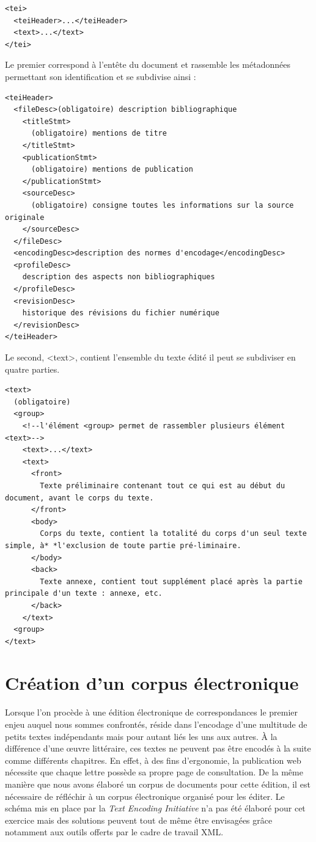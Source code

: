 \documentclass[12pt,a4paper]{book} %
\begin{document}
\begin{lstlisting}
<tei>
  <teiHeader>...</teiHeader>
  <text>...</text>
</tei>
\end{lstlisting}
\bigskip

Le premier correspond à l'entête du document et rassemble les métadonnées permettant son identification et se subdivise ainsi : 
\bigskip

\begin{lstlisting}
<teiHeader>
  <fileDesc>(obligatoire) description bibliographique
    <titleStmt>
      (obligatoire) mentions de titre
    </titleStmt>
    <publicationStmt>
      (obligatoire) mentions de publication
    </publicationStmt>
    <sourceDesc>
      (obligatoire) consigne toutes les informations sur la source originale 
    </sourceDesc>  
  </fileDesc>
  <encodingDesc>description des normes d'encodage</encodingDesc>
  <profileDesc>
    description des aspects non bibliographiques
  </profileDesc>
  <revisionDesc>
    historique des révisions du fichier numérique
  </revisionDesc>
</teiHeader>
\end{lstlisting}
\bigskip

Le second, <text>, contient l'ensemble du texte édité il peut se subdiviser en quatre parties.
\bigskip

\begin{lstlisting}
<text>
  (obligatoire)
  <group>
    <!--l'élément <group> permet de rassembler plusieurs élément <text>-->
    <text>...</text>
    <text>   
      <front>
        Texte préliminaire contenant tout ce qui est au début du document, avant le corps du texte.    
      </front>
      <body>
        Corps du texte, contient la totalité du corps d'un seul texte simple, à* *l'exclusion de toute partie pré-liminaire.    
      </body>
      <back>
        Texte annexe, contient tout supplément placé après la partie principale d'un texte : annexe, etc.    
      </back>
    </text>
  <group>
</text>
\end{lstlisting}
\bigskip

\section{Création d'un corpus électronique}

Lorsque l'on procède à une édition électronique de correspondances le premier enjeu auquel nous sommes confrontés, réside dans l'encodage d'une multitude de petits textes indépendants mais pour autant liés les uns aux autres. À la différence d'une œuvre littéraire, ces textes ne peuvent pas être encodés à la suite comme différents chapitres. En effet, à des fins d'ergonomie, la publication web nécessite que chaque lettre possède sa propre page de consultation. De la même manière que nous avons élaboré un corpus de documents pour cette édition, il est nécessaire de réfléchir à un corpus électronique organisé pour les éditer. Le schéma mis en place par la \textit{Text Encoding Initiative} n'a pas été élaboré pour cet exercice mais des solutions peuvent tout de même être envisagées grâce notamment aux outils offerts par le cadre de travail XML.
\end{document}
